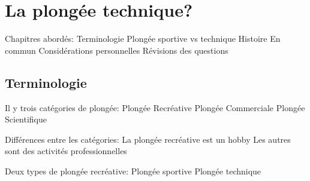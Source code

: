 
\section{La plongée technique?}

\begin{frame}
	\begin{outline}
		\1 Chapitres abordés:
			\2 Terminologie
			\2 Plongée sportive vs technique
			\2 Histoire
			\2 En commun
			\2 Considérations personnelles
			\2 Révisions des questions
	\end{outline}
\end{frame}


\subsection{Terminologie}

\begin{frame}{\insertsubsection}
	\begin{outline}
		\1 Il y trois catégories de plongée:
			\2 Plongée Recréative
			\2 Plongée Commerciale
			\2 Plongée Scientifique
	\end{outline}
\end{frame}

\begin{frame}{\insertsubsection}
	\begin{outline}
		\1 Différences entre les catégories:
			\2 La plongée recréative est un hobby
			\2 Les autres sont des activités professionnelles
	\end{outline}
\end{frame}

\begin{frame}{\insertsubsection}
	\begin{outline}
		\1 Deux types de plongée recréative:
			\2 Plongée sportive
			\2 Plongée technique
	\end{outline}
\end{frame}



